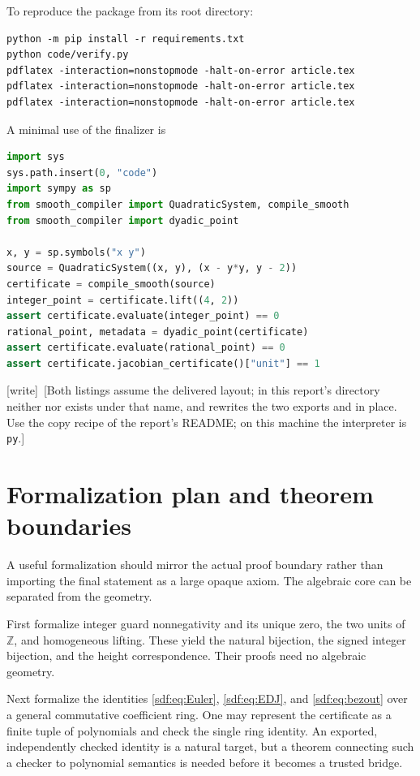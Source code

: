 \documentclass[11pt,a4paper]{article}
\theoremstyle{definition}
\theoremstyle{remark}
\newcommand{\Z}{\mathbb Z}
\newcommand{\wtag}{\textup{[write]}}
\begin{document}
To reproduce the package from its root directory:
\begin{lstlisting}
python -m pip install -r requirements.txt
python code/verify.py
pdflatex -interaction=nonstopmode -halt-on-error article.tex
pdflatex -interaction=nonstopmode -halt-on-error article.tex
pdflatex -interaction=nonstopmode -halt-on-error article.tex
\end{lstlisting}
A minimal use of the finalizer is
\begin{lstlisting}[language=Python]
import sys
sys.path.insert(0, "code")
import sympy as sp
from smooth_compiler import QuadraticSystem, compile_smooth
from smooth_compiler import dyadic_point

x, y = sp.symbols("x y")
source = QuadraticSystem((x, y), (x - y*y, y - 2))
certificate = compile_smooth(source)
integer_point = certificate.lift((4, 2))
assert certificate.evaluate(integer_point) == 0
rational_point, metadata = dyadic_point(certificate)
assert certificate.evaluate(rational_point) == 0
assert certificate.jacobian_certificate()["unit"] == 1
\end{lstlisting}
\wtag\ [Both listings assume the delivered layout; in this report's
directory neither  nor  exists
under that name, and  rewrites the two exports and
 in place. Use the copy recipe of the report's README; on
this machine the interpreter is \texttt{py}.]

\section{Formalization plan and theorem boundaries}\label{sdf:sec:boundaries}

A useful formalization should mirror the actual proof boundary rather than
importing the final statement as a large opaque axiom. The algebraic core
can be separated from the geometry.

First formalize integer guard nonnegativity and its unique zero, the two
units of $\Z$, and homogeneous lifting. These yield the natural bijection,
the signed integer bijection, and the height correspondence. Their proofs
need no algebraic geometry.

Next formalize the identities \eqref{sdf:eq:Euler}, \eqref{sdf:eq:EDJ}, and
\eqref{sdf:eq:bezout} over a general commutative coefficient ring. One may
represent the certificate as a finite tuple of polynomials and check the
single ring identity. An exported, independently checked identity is a
natural target, but a theorem connecting such a checker to polynomial
semantics is needed before it becomes a trusted bridge.
\end{document}
